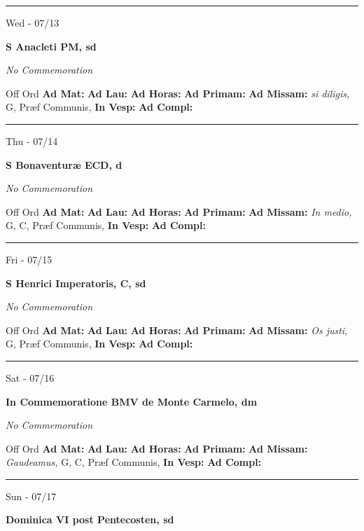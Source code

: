 \documentclass[letterpaper, 10pt]{article}
\begin{document}
\hrule
\begin{center}
Wed - 07/13
\end{center}\textbf{ \large S Anacleti PM, \textnormal{\normalsize sd}}

\textit{No Commemoration}\begin{justify}
Off Ord
\textbf{Ad Mat: }
\textbf{Ad Lau: }
\textbf{Ad Horas: }
\textbf{Ad Primam: }
\textbf{Ad Missam:} \textit{si diligis, } G, Præf Communis, 
\textbf{In Vesp: }
\textbf{Ad Compl: }\end{justify}



\hrule
\begin{center}
Thu - 07/14
\end{center}\textbf{ \large S Bonaventuræ ECD, \textnormal{\normalsize d}}

\textit{No Commemoration}\begin{justify}
Off Ord
\textbf{Ad Mat: }
\textbf{Ad Lau: }
\textbf{Ad Horas: }
\textbf{Ad Primam: }
\textbf{Ad Missam:} \textit{In medio, } G, C, Præf Communis, 
\textbf{In Vesp: }
\textbf{Ad Compl: }\end{justify}



\hrule
\begin{center}
Fri - 07/15
\end{center}\textbf{ \large S Henrici Imperatoris, C, \textnormal{\normalsize sd}}

\textit{No Commemoration}\begin{justify}
Off Ord
\textbf{Ad Mat: }
\textbf{Ad Lau: }
\textbf{Ad Horas: }
\textbf{Ad Primam: }
\textbf{Ad Missam:} \textit{Os justi, } G, Præf Communis, 
\textbf{In Vesp: }
\textbf{Ad Compl: }\end{justify}



\hrule
\begin{center}
Sat - 07/16
\end{center}\textbf{ \large In Commemoratione BMV de Monte Carmelo, \textnormal{\normalsize dm}}

\textit{No Commemoration}\begin{justify}
Off Ord
\textbf{Ad Mat: }
\textbf{Ad Lau: }
\textbf{Ad Horas: }
\textbf{Ad Primam: }
\textbf{Ad Missam:} \textit{Gaudeamus, } G, C, Præf Communis, 
\textbf{In Vesp: }
\textbf{Ad Compl: }\end{justify}



\hrule
\begin{center}
Sun - 07/17
\end{center}\textbf{ \large Dominica VI post Pentecosten, \textnormal{\normalsize sd}}
\end{document}
